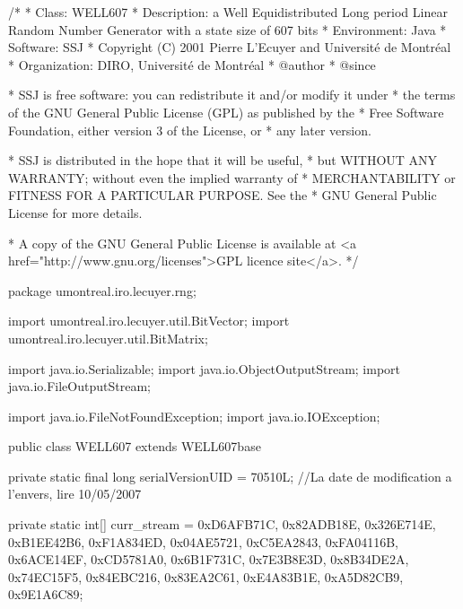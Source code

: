 \begin{code}
\begin{hide}
/*
 * Class:        WELL607
 * Description:  a Well Equidistributed Long period Linear Random Number
                 Generator with a state size of 607 bits
 * Environment:  Java
 * Software:     SSJ 
 * Copyright (C) 2001  Pierre L'Ecuyer and Université de Montréal
 * Organization: DIRO, Université de Montréal
 * @author       
 * @since

 * SSJ is free software: you can redistribute it and/or modify it under
 * the terms of the GNU General Public License (GPL) as published by the
 * Free Software Foundation, either version 3 of the License, or
 * any later version.

 * SSJ is distributed in the hope that it will be useful,
 * but WITHOUT ANY WARRANTY; without even the implied warranty of
 * MERCHANTABILITY or FITNESS FOR A PARTICULAR PURPOSE.  See the
 * GNU General Public License for more details.

 * A copy of the GNU General Public License is available at
   <a href="http://www.gnu.org/licenses">GPL licence site</a>.
 */
\end{hide}
package umontreal.iro.lecuyer.rng; \begin{hide}

import umontreal.iro.lecuyer.util.BitVector;
import umontreal.iro.lecuyer.util.BitMatrix;

import java.io.Serializable;
import java.io.ObjectOutputStream;
import java.io.FileOutputStream;

import java.io.FileNotFoundException;
import java.io.IOException; \end{hide}

public class WELL607 extends WELL607base \begin{hide} {

   private static final long serialVersionUID = 70510L;
   //La date de modification a l'envers, lire 10/05/2007
   
   private static int[] curr_stream = {0xD6AFB71C, 0x82ADB18E, 0x326E714E,
                                       0xB1EE42B6, 0xF1A834ED, 0x04AE5721,
                                       0xC5EA2843, 0xFA04116B, 0x6ACE14EF,
                                       0xCD5781A0, 0x6B1F731C, 0x7E3B8E3D,
                                       0x8B34DE2A, 0x74EC15F5, 0x84EBC216,
                                       0x83EA2C61, 0xE4A83B1E, 0xA5D82CB9,
                                       0x9E1A6C89};

}
\end{hide}
\end{code}

